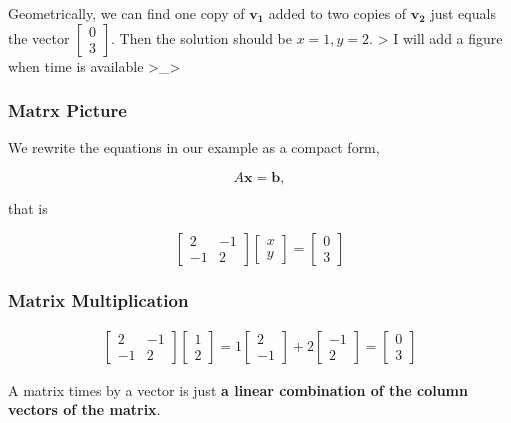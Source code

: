 \documentclass[]{article}
\begin{document}
Geometrically, we can find one copy of \(\boldsymbol{v_1}\) added to two
copies of \(\boldsymbol{v_2}\) just equals the vector
\(\begin{bmatrix}0 \\3\end{bmatrix}\). Then the solution should be
\(x = 1, y =2\). \textgreater{} I will add a figure when time is
available \textgreater{}\_\textgreater{}

\hypertarget{matrx-picture}{%
\subsubsection{Matrx Picture}\label{matrx-picture}}

We rewrite the equations in our example as a compact form,

\[
A\boldsymbol{x} = \boldsymbol{b},
\]

that is

\[
\begin{bmatrix}2 & -1 \\ -1 & 2\end{bmatrix}\begin{bmatrix}x \\y\end{bmatrix} = \begin{bmatrix}0 \\3\end{bmatrix}
\]

\hypertarget{matrix-multiplication}{%
\subsubsection{Matrix Multiplication}\label{matrix-multiplication}}

\[
\begin{aligned}
\begin{bmatrix}2 & -1 \\ -1 & 2\end{bmatrix} \begin{bmatrix}1 \\ 2\end{bmatrix} = 1\begin{bmatrix}2 \\-1\end{bmatrix} + 2\begin{bmatrix}-1 \\2\end{bmatrix} = \begin{bmatrix}0 \\3\end{bmatrix}
\end{aligned}
\]

A matrix times by a vector is just \textbf{a linear combination of the
column vectors of the matrix}.
\end{document}
